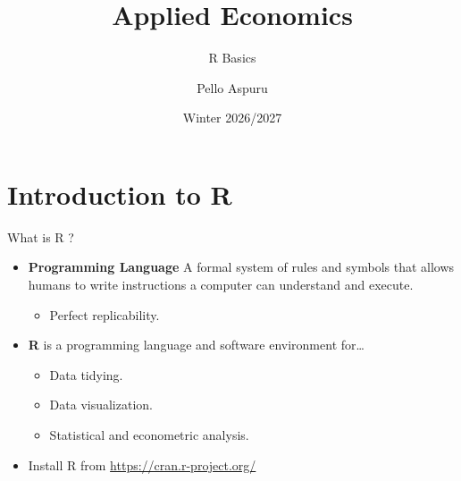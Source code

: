 \documentclass[9pt,aspectratio=169]{beamer}
\title{Applied Economics}
\subtitle{R Basics}
\author{Pello Aspuru}
\date{Winter 2026/2027}
\begin{document}
{
  \begin{frame}
    \titlepage
  \end{frame}
}

\section{Introduction to R}


\begin{frame}{What is R ?}

\begin{itemize}
    \item \textbf{Programming Language} A formal system of rules and symbols that allows humans to write instructions a computer can understand and execute.
    \begin{itemize}
      \item Perfect replicability.
    \end{itemize}
    \item \textbf{R} is a programming language and software environment for\dots
    \begin{itemize}
      \item Data tidying.
      \item Data visualization.
      \item Statistical and econometric analysis.
    \end{itemize}
    \item Install R from \url{https://cran.r-project.org/}
\end{itemize}
\end{frame}
\end{document}
